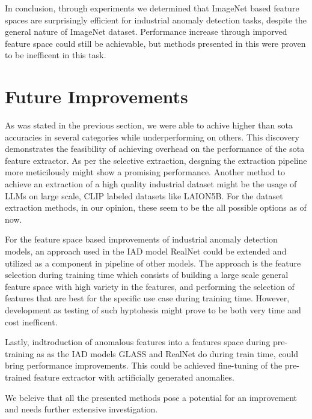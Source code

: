 In conclusion, through experiments we determined that ImageNet based feature spaces are surprisingly efficient for industrial anomaly detection tasks, despite the general nature of ImageNet dataset. Performance increase through imporved feature space could still be achievable, but methods presented in this were proven to be inefficent in this task.

\section{Future Improvements}

As was stated in the previous section, we were able to achive higher than sota accuracies in several categories while underperforming on others. This discovery demonstrates the feasibility of achieving overhead on the performance of the sota feature extractor. As per the selective extraction, desgning the extraction pipeline more meticilously might show a promising performance. Another method to achieve an extraction of a high quality industrial dataset might be the usage of LLMs on large scale, CLIP labeled datasets like LAION5B. For the dataset extraction methods, in our opinion, these seem to be the all possible options as of now.

For the feature space based improvements of industrial anomaly detection models, an approach used in the IAD model RealNet could be extended and utilized as a component in pipeline of other models. The approach is the feature selection during training time which consists of building a large scale general feature space with high variety in the features, and performing the selection of features that are best for the specific use case during training time. However, development as testing of such hyptohesis might prove to be both very time and cost inefficent.

Lastly, indtroduction of anomalous features into a features space during pre-training as as the IAD models GLASS and RealNet do during train time, could bring performance improvements. This could be achieved fine-tuning of the pre-trained feature extractor with artificially generated anomalies.

We beleive that all the presented methods pose a potential for an improvement and needs further extensive investigation.